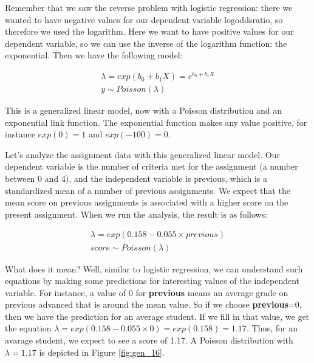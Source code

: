 \documentclass[]{report}\usepackage[]{graphicx}\usepackage[]{color}
\begin{document}
Remember that we saw the reverse problem with logistic regression: there we wanted to have negative values for our dependent variable logoddsratio, so therefore we used the logarithm. Here we want to have positive values for our dependent variable, so we can use the inverse of the logarithm function: the exponential. Then we have the following model:


\begin{eqnarray}
\lambda = exp(b_0 + b_1 X)= e^{b_0+b_1X} \\
y \sim Poisson(\lambda)
\end{eqnarray}


This is a generalized linear model, now with a Poisson distribution and an exponential link function. The exponential function makes any value positive, for instance $exp(0)=1$ and $exp(-100)=0$.

Let's analyze the assignment data with this generalized linear model. Our dependent variable is the number of criteria met for the assignment (a number between 0 and 4), and the independent variable is previous, which is a standardized mean of a number of previous assignments. We expect that the mean score on previous assignments is associated with a higher score on the present assignment. When we run the analysis, the result is as follows:


\begin{eqnarray}
\lambda = exp(0.158 -0.055 \times previous) \\
score \sim Poisson(\lambda)
\end{eqnarray}

What does it mean? Well, similar to logistic regression, we can understand such equations by making some predictions for interesting values of the independent variable. For instance, a value of 0 for \textbf{previous} means an average grade on previous advanced that is around the mean value. So if we choose \textbf{previous}=0, then we have the prediction for an average student. If we fill in that value, we get the equation $\lambda=exp(0.158 -0.055 \times 0)= exp (0.158)= 1.17$. Thus, for an avarage student, we expect to see a score of 1.17. A Poisson distribution with $\lambda=1.17$ is depicted in Figure \ref{fig:gen_16}.
\end{document}
